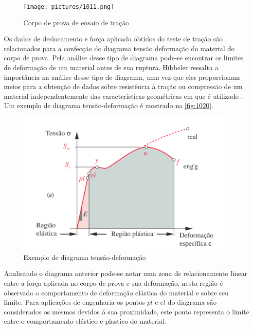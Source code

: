 \begin{figure}[htb]
	\caption{\label{fig:1011} Corpo de prova de ensaio de tração}
	\begin{center}
		\texttt{[image: pictures/1011.png]}
	\end{center}
\end{figure}

Os dados de deslocamento e força aplicada obtidos do teste de tração são relacionados para a confecção do diagrama tensão deformação do material do corpo de prova.
Pela análise desse tipo de diagrama pode-se encontrar os limites de deformação de um material antes de sua ruptura.
Hibbeler ressalta a importância na análise desse tipo de diagrama, uma vez que eles proporcionam meios para a obtenção de dados sobre resistência à tração
ou compressão de um material independentemente das características geométricas em que é utilizado \autocite{Hibbeler2010}.
Um exemplo de diagrama tensão-deformação é mostrado na \autoref{fig:1020}.

\begin{figure}[htb]
	\caption{\label{fig:1020} Exemplo de diagrama tensão-deformação}
	\begin{center}
		\includegraphics[width=\textwidth]{pictures/1020.png}
	\end{center}
\end{figure}

Analisando o diagrama anterior pode-se notar uma zona de relacionamento linear entre a força aplicada no corpo de prova e sua deformação,
nesta região é observado o comportamento de deformação elástica do material e sobre seu limite.
Para aplicações de engenharia os pontos $pl$ e $el$ do diagrama são considerados os mesmos devidos á sua proximidade, este ponto representa
o limite entre o comportamento elástico e plastico do material. \autocite{Norton2011}


